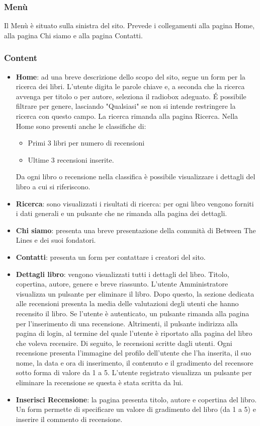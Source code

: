 \documentclass[12pt,a4paper,headings=optiontohead]{article}
\begin{document}
	
	\subsubsection{Menù}
	
	Il Menù è situato sulla sinistra del sito. Prevede i collegamenti alla pagina Home, alla pagina Chi siamo e alla pagina Contatti.
	
	\subsubsection{Content}
	
	\begin{itemize}
		\item \textbf{Home}: ad una breve descrizione dello scopo del sito, segue un form per la ricerca dei libri. L'utente digita le parole chiave e, a seconda che la ricerca avvenga per titolo o per autore, seleziona il radiobox adeguato. \'E possibile filtrare per genere, lasciando "Qualsiasi" se non si intende restringere la ricerca con questo campo. La ricerca rimanda alla pagina Ricerca. Nella Home sono presenti anche le classifiche di:
		\begin{itemize}
			\item Primi 3 libri per numero di recensioni
			\item Ultime 3 recensioni inserite.
		\end{itemize} 
		Da ogni libro o recensione nella classifica è possibile visualizzare i dettagli del libro a cui si riferiscono.
		\item \textbf{Ricerca}: sono visualizzati i risultati di ricerca: per ogni libro vengono forniti i dati generali e un pulsante che ne rimanda alla pagina dei dettagli.
		\item \textbf{Chi siamo}: presenta una breve presentazione della comunità di Between The Lines e dei suoi fondatori.
		\item \textbf{Contatti}: presenta un form per contattare i creatori del sito.
		\item \textbf{Dettagli libro}: vengono visualizzati tutti i dettagli del libro. Titolo, copertina, autore, genere e breve riassunto. L'utente Amministratore visualizza un pulsante per eliminare il libro. Dopo questo, la sezione dedicata alle recensioni presenta la media delle valutazioni degli utenti che hanno recensito il libro. Se l'utente è autenticato, un pulsante rimanda alla pagina per l'inserimento di una recensione. Altrimenti, il pulsante indirizza alla pagina di login, al termine del quale l'utente è riportato alla pagina del libro che voleva recensire. Di seguito, le recensioni scritte dagli utenti. Ogni recensione presenta l'immagine del profilo dell'utente che l'ha inserita, il suo nome, la data e ora di inserimento, il contenuto e il gradimento del recensore sotto forma di valore da 1 a 5. L'utente registrato visualizza un pulsante per eliminare la recensione se questa è stata scritta da lui.
		\item \textbf{Inserisci Recensione}: la pagina presenta titolo, autore e copertina del libro. Un form permette di specificare un valore di gradimento del libro (da 1 a 5) e inserire il commento di recensione.
	\end{itemize}
	
\end{document}
